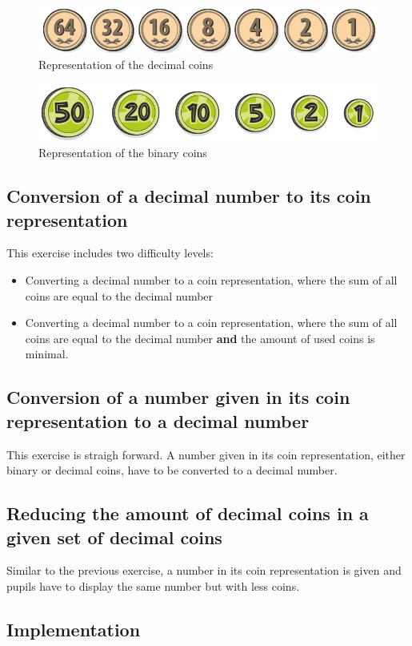 \begin{figure} 
    \centering
    \includegraphics[width=0.5 \columnwidth]{figures/decimal_coins.png}
    \caption{Representation of the decimal coins} 
    \label{fig:decimal_coins} 
\end{figure}

\begin{figure} 
    \centering
    \includegraphics[width=0.5 \columnwidth]{figures/binary_coins.png}
    \caption{Representation of the binary coins} 
    \label{fig:binary_coins} 
\end{figure}

\subsection*{Conversion of a decimal number to its coin representation}

This exercise includes two difficulty levels:
\begin{itemize}
    \item Converting a decimal number to a coin representation, where the sum of all coins are equal to the decimal number
    \item Converting a decimal number to a coin representation, where the sum of all coins are equal to the decimal number \textbf{and} the amount of used coins is minimal.
\end{itemize}

\subsection*{Conversion of a number given in its coin representation to a decimal number}

This exercise is straigh forward. A number given in its coin representation, either binary or decimal coins, have to be converted to a decimal number. 

\subsection*{Reducing the amount of decimal coins in a given set of decimal coins}

Similar to the previous exercise, a number in its coin representation is given and pupils have to display the same number but with less coins.


\subsection{Implementation}